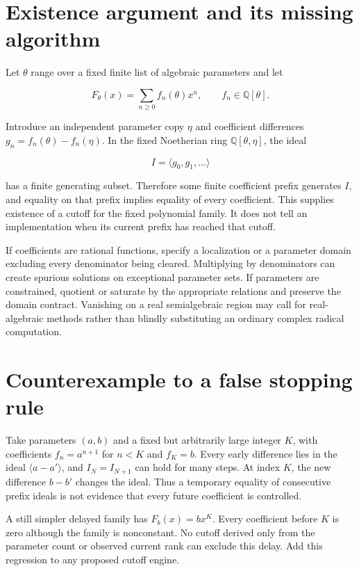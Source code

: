 \documentclass[
  11pt,
  a4paper,
]{report}
\begin{document}
\hypertarget{existence-argument-and-its-missing-algorithm}{%
\section{Existence argument and its missing
algorithm}\label{existence-argument-and-its-missing-algorithm}}

Let \(\theta\) range over a fixed finite list of algebraic parameters
and let

\[
F_\theta(x)=\sum_{n\ge0}f_n(\theta)x^n,\qquad
f_n\in\mathbb Q[\theta].
\]

Introduce an independent parameter copy \(\eta\) and coefficient
differences \(g_n=f_n(\theta)-f_n(\eta)\). In the fixed Noetherian ring
\(\mathbb Q[\theta,\eta]\), the ideal

\[
I=\langle g_0,g_1,\ldots\rangle
\]

has a finite generating subset. Therefore some finite coefficient prefix
generates \(I\), and equality on that prefix implies equality of every
coefficient. This supplies existence of a cutoff for the fixed
polynomial family. It does not tell an implementation when its current
prefix has reached that cutoff.

If coefficients are rational functions, specify a localization or a
parameter domain excluding every denominator being cleared. Multiplying
by denominators can create spurious solutions on exceptional parameter
sets. If parameters are constrained, quotient or saturate by the
appropriate relations and preserve the domain contract. Vanishing on a
real semialgebraic region may call for real-algebraic methods rather
than blindly substituting an ordinary complex radical computation.

\hypertarget{counterexample-to-a-false-stopping-rule}{%
\section{Counterexample to a false stopping
rule}\label{counterexample-to-a-false-stopping-rule}}

Take parameters \((a,b)\) and a fixed but arbitrarily large integer
\(K\), with coefficients \(f_n=a^{n+1}\) for \(n<K\) and \(f_K=b\).
Every early difference lies in the ideal \(\langle a-a'\rangle\), and
\(I_N=I_{N+1}\) can hold for many steps. At index \(K\), the new
difference \(b-b'\) changes the ideal. Thus a temporary equality of
consecutive prefix ideals is not evidence that every future coefficient
is controlled.

A still simpler delayed family has \(F_b(x)=b x^K\). Every coefficient
before \(K\) is zero although the family is nonconstant. No cutoff
derived only from the parameter count or observed current rank can
exclude this delay. Add this regression to any proposed cutoff engine.
\end{document}
